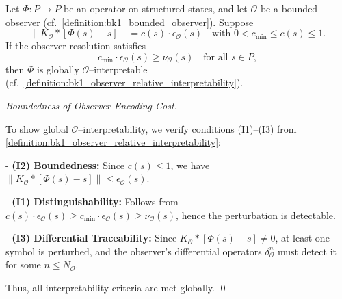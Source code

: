 \begin{lemma}
\label{lemma:bk1_bounded_approximation_and_interpretability}

Let $\Phi : P \to P$ be an operator on structured states, and let $\mathcal{O}$ be a bounded observer (cf.~\ref{definition:bk1_bounded_observer}).  
Suppose
\[
\|K_{\mathcal{O}} \ast [\Phi(s) - s]\| = c(s) \cdot \epsilon_{\mathcal{O}}(s)
\quad \text{with } 0 < c_{\min} \le c(s) \le 1.
\]
If the observer resolution satisfies
\[
c_{\min} \cdot \epsilon_{\mathcal{O}}(s) \ge \nu_{\mathcal{O}}(s)
\quad \text{for all } s \in P,
\]
then $\Phi$ is globally $\mathcal{O}$–interpretable (cf.~\ref{definition:bk1_observer_relative_interpretability}).

\end{lemma}

\begin{proof}[Boundedness of Observer Encoding Cost]
\label{proof:bk1_boundedness_encoding_cost}

To show global $\mathcal{O}$–interpretability, we verify conditions (I1)–(I3) from \ref{definition:bk1_observer_relative_interpretability}:

- \textbf{(I2) Boundedness:} Since \(c(s) \le 1\), we have  
  \(\|K_{\mathcal{O}} \ast [\Phi(s) - s]\| \le \epsilon_{\mathcal{O}}(s)\).

- \textbf{(I1) Distinguishability:} Follows from  
  \(c(s) \cdot \epsilon_{\mathcal{O}}(s) \ge c_{\min} \cdot \epsilon_{\mathcal{O}}(s) \ge \nu_{\mathcal{O}}(s)\),  
  hence the perturbation is detectable.

- \textbf{(I3) Differential Traceability:} Since \(K_{\mathcal{O}} \ast [\Phi(s) - s] \ne 0\),  
  at least one symbol is perturbed, and the observer’s differential operators \(\delta^n_{\mathcal{O}}\)  
  must detect it for some \(n \le N_{\mathcal{O}}\).

Thus, all interpretability criteria are met globally. \qed

\end{proof}

\vspace{1em}

